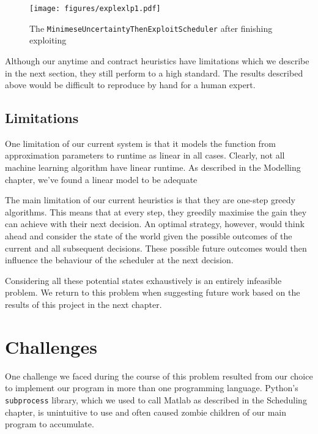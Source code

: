 \documentclass[a4paper,12pt,twoside,openright]{report}
\begin{document}
\begin{figure}
\centering
  \texttt{[image: figures/explexlp1.pdf]}
  \caption{The \texttt{MinimeseUncertaintyThenExploitScheduler} after finishing exploiting}
  \label{explexlp1}
\end{figure}



Although our anytime and contract heuristics have limitations which we describe in the next section, they still perform to a high standard. The results described above would be difficult to reproduce by hand for a human expert.

\subsection{Limitations}
One limitation of our current system is that it models the function from approximation parameters to runtime as linear in all cases. Clearly, not all machine learning algorithm have linear runtime. As described in the Modelling chapter, we've found a linear model to be adequate 

The main limitation of our current heuristics is that they are one-step greedy algorithms. This means that at every step, they greedily maximise the gain they can achieve with their next decision. An optimal strategy, however, would think ahead and consider the state of the world given the possible outcomes of the current and all subsequent decisions. These possible future outcomes would then influence the behaviour of the scheduler at the next decision. 


Considering all these potential states exhaustively is an entirely infeasible problem. We return to this problem when suggesting future work based on the results of this project in the next chapter.



\section{Challenges}
One challenge we faced during the course of this problem resulted from our choice to implement our program in more than one programming language. Python's \texttt{subprocess} library, which we used to call Matlab as described in the Scheduling chapter, is unintuitive to use and often caused zombie children of our main program to accumulate. 
\end{document}

